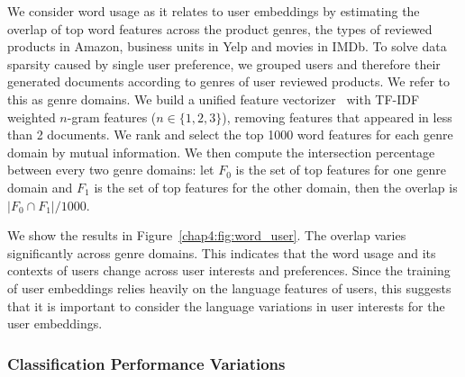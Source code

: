 We consider word usage as it relates to user embeddings by estimating the overlap of top word features across the product genres, the types of reviewed products in Amazon, business units in Yelp and movies in IMDb.
To solve data sparsity caused by single user preference, we grouped users and therefore their generated documents according to genres of user reviewed products.
We refer to this as genre domains.
We build a unified feature vectorizer~\cite{pedregosa2011scikit} with TF-IDF weighted $n$-gram features ($n \in \{1,2,3\}$), removing features that appeared in less than 2 documents.
We rank and select the top 1000 word features for each genre domain by mutual information.
We then compute the intersection percentage between every two genre domains: let $F_0$ is the set of top features for one genre domain and $F_1$ is the set of top features for the other domain, then the overlap is $|F_0 \cap F_1|/1000$.

We show the results in Figure~\ref{chap4:fig:word_user}.
The overlap varies significantly across genre domains. 
This indicates that the word usage and its contexts of users change across user interests and preferences. 
Since the training of user embeddings relies heavily on the language features of users, this suggests that it is important to consider the language variations in user interests for the user embeddings.


\subsubsection{Classification Performance Variations}

